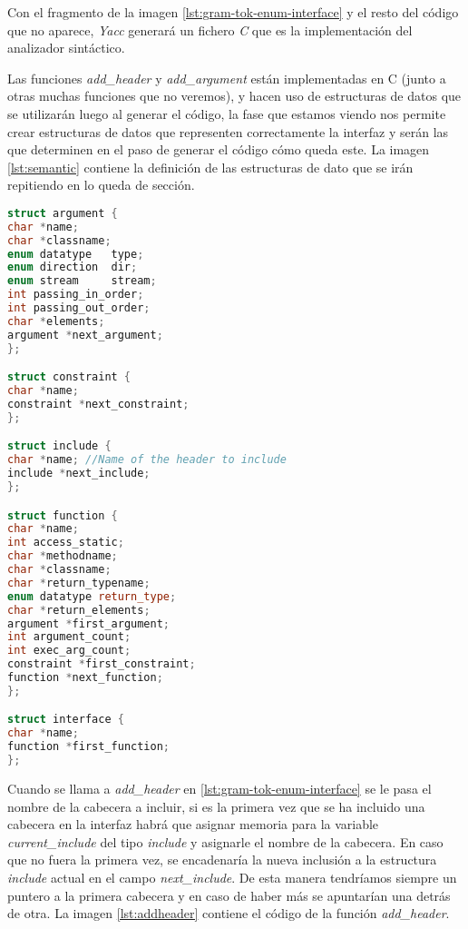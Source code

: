 \bigskip

Con el fragmento de la imagen \ref{lst:gram-tok-enum-interface} y el resto del código que no aparece, \textit{Yacc} generará un fichero \textit{C} que es la implementación del analizador sintáctico. 

\par\bigskip

Las funciones \textit{add\_header} y \textit{add\_argument} están implementadas en C (junto a otras muchas funciones que no veremos), y hacen uso de estructuras de datos que se utilizarán luego al generar el código, la fase que estamos viendo nos permite crear estructuras de datos que representen correctamente la interfaz y serán las que determinen en el paso de generar el código cómo queda este. La imagen \ref{lst:semantic} contiene la definición de las estructuras de dato que se irán repitiendo en lo queda de sección.

\bigskip
\begin{minipage}{\linewidth}
\begin{lstlisting}[caption={Definición de las estructuras de datos utilizadas en el compilador.},captionpos=b, label={lst:semantic}, language=C++]
struct argument {
char *name;
char *classname;
enum datatype   type;
enum direction  dir;
enum stream     stream;
int passing_in_order;
int passing_out_order;
char *elements;
argument *next_argument;
};

struct constraint {
char *name;
constraint *next_constraint;
};

struct include {
char *name; //Name of the header to include
include *next_include;
};

struct function {
char *name;
int access_static;
char *methodname;
char *classname;
char *return_typename;
enum datatype return_type;
char *return_elements;
argument *first_argument;
int argument_count;
int exec_arg_count;
constraint *first_constraint;
function *next_function;
};

struct interface {
char *name;
function *first_function;
};
\end{lstlisting}
\end{minipage}

\bigskip

Cuando se llama a \textit{add\_header} en \ref{lst:gram-tok-enum-interface} se le pasa el nombre de la cabecera a incluir, si es la primera vez que se ha incluido una cabecera en la interfaz habrá que asignar memoria para la variable \textit{current\_include} del tipo \textit{include} y asignarle el nombre de la cabecera. En caso que no fuera la primera vez, se encadenaría la nueva inclusión a la estructura \textit{include} actual en el campo \textit{next\_include}. De esta manera tendríamos siempre un puntero a la primera cabecera y en caso de haber más se apuntarían una detrás de otra. La imagen \ref{lst:addheader} contiene el código de la función \textit{add\_header}.

